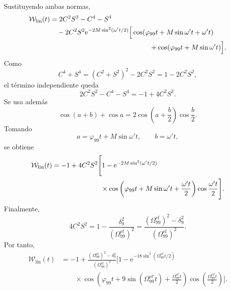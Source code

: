 \documentclass[11pt]{article}
\newcommand{\ee}{\mathrm{e}}
\begin{document}
Sustituyendo ambas normas,
\begin{align}
  \mathcal W_{\mathrm{lin}}(t)
  &=
  2C^2S^2-C^4-S^4
  \notag\\
  &\quad-
  2C^2S^2
  \ee^{-2M\sin^2(\omega't/2)}
  \Big[
  \cos(\varphi_{99}t+M\sin\omega't+\omega't)
  \notag\\
  &\hspace{5.1cm}
  +
  \cos(\varphi_{99}t+M\sin\omega't)
  \Big].
\end{align}
Como
\begin{equation}
  C^4+S^4
  =
  (C^2+S^2)^2-2C^2S^2
  =
  1-2C^2S^2,
\end{equation}
el t\'ermino independiente queda
\begin{equation}
  2C^2S^2-C^4-S^4
  =
  -1+4C^2S^2.
\end{equation}
Se usa adem\'as
\begin{equation}
  \cos(a+b)+\cos a
  =
  2\cos\left(a+\frac b2\right)\cos\frac b2.
\end{equation}
Tomando
\begin{equation}
  a=\varphi_{99}t+M\sin\omega't,
  \qquad
  b=\omega't,
\end{equation}
se obtiene
\begin{align}
  \mathcal W_{\mathrm{lin}}(t)
  &=-1+4C^2S^2
  \Bigg[
  1-
  \ee^{-2M\sin^2(\omega't/2)}
  \notag\\
  &\hspace{2.5cm}\times
  \cos\left(
  \varphi_{99}t+M\sin\omega't+\frac{\omega't}{2}
  \right)
  \cos\frac{\omega't}{2}
  \Bigg].
\end{align}
Finalmente,
\begin{equation}
  4C^2S^2
  =
  1-\frac{\delta_9^2}{(\Omega_{99}^{\mathrm{ef}})^2}
  =
  \frac{(\Omega_{99}^{\mathrm{ef}})^2-\delta_9^2}
  {(\Omega_{99}^{\mathrm{ef}})^2}.
\end{equation}
Por tanto,
\begin{equation}
  \boxed{
  \begin{aligned}
  \mathcal W_{\mathrm{lin}}(t)
  &=-1+
  \frac{(\Omega_{99}^{\mathrm{ef}})^2-\delta_9^2}
  {(\Omega_{99}^{\mathrm{ef}})^2}
  \Bigg[
  1-
  \ee^{-18\sin^2(\Omega_{99}^{\mathrm{ef}\prime}t/2)}
  \\
  &\qquad\times
  \cos\left(
  \varphi_{99}t
  +9\sin(\Omega_{99}^{\mathrm{ef}\prime}t)
  +\frac{\Omega_{99}^{\mathrm{ef}\prime}t}{2}
  \right)
  \cos\left(
  \frac{\Omega_{99}^{\mathrm{ef}\prime}t}{2}
  \right)
  \Bigg].
  \end{aligned}
  }
\end{equation}
\end{document}

